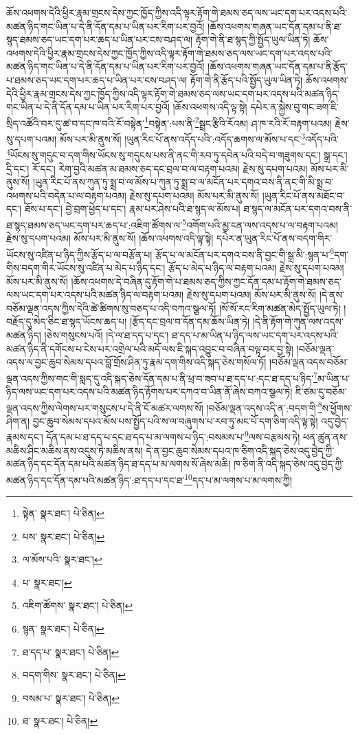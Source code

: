 ཆོས་འཕགས་དེའི་ཕྱིར་རྣམ་གྲངས་དེས་ཀྱང་ཁྱོད་ཀྱིས་འདི་ལྟར་རྟོག་གེ་ཐམས་ཅད་ལས་ཡང་དག་པར་འདས་པའི་མཚན་ཉིད་གང་ཡིན་པ་དེ་ནི་དོན་དམ་པ་ཡིན་པར་རིག་པར་བྱའོ། །ཆོས་འཕགས་གཞན་ཡང་དོན་དམ་པ་ནི་ཐ་སྙད་ཐམས་ཅད་ཡང་དག་པར་ཆད་པ་ཡིན་པར་ངས་བཤད་ལ། རྟོག་གེ་ནི་ཐ་སྙད་ཀྱི་སྤྱོད་ཡུལ་ཡིན་ཏེ། ཆོས་འཕགས་དེའི་ཕྱིར་རྣམ་གྲངས་དེས་ཀྱང་ཁྱོད་ཀྱིས་འདི་ལྟར་རྟོག་གེ་ཐམས་ཅད་ལས་ཡང་དག་པར་འདས་པའི་མཚན་ཉིད་གང་ཡིན་པ་དེ་ནི་དོན་དམ་པ་ཡིན་པར་རིག་པར་བྱའོ། །ཆོས་འཕགས་གཞན་ཡང་དོན་དམ་པ་ནི་རྩོད་པ་ཐམས་ཅད་ཡང་དག་པར་ཆད་པ་ཡིན་པར་ངས་བཤད་ལ། རྟོག་གེ་ནི་རྩོད་པའི་སྤྱོད་ཡུལ་ཡིན་ཏེ། ཆོས་འཕགས་དེའི་ཕྱིར་རྣམ་གྲངས་དེས་ཀྱང་ཁྱོད་ཀྱིས་འདི་ལྟར་རྟོག་གེ་ཐམས་ཅད་ལས་ཡང་དག་པར་འདས་པའི་མཚན་ཉིད་གང་ཡིན་པ་དེ་ནི་དོན་དམ་པ་ཡིན་པར་རིག་པར་བྱའོ། །ཆོས་འཕགས་འདི་ལྟ་སྟེ། དཔེར་ན་སྐྱེས་བུ་གང་ཟག་ཇི་སྲིད་འཚོའི་བར་དུ་ཚ་བ་དང་ཁ་བའི་རོ་བསྟེན་\footnote{སྟེན་  སྣར་ཐང་།  པེ་ཅིན། }བསྟེན་:པས་ནི་\footnote{པས་  སྣར་ཐང་།  པེ་ཅིན། }སྦྲང་རྩིའི་རོའམ། ཤ་ཁ་རའི་རོ་བརྟག་པའམ། རྗེས་སུ་དཔག་པའམ། མོས་པར་མི་ནུས་སོ། །ཡུན་རིང་པོ་ནས་འདོད་པའི་:འདོད་ཆགས་ལ་མོས་པ་དང་\footnote{ལ་མོས་པའི་  སྣར་ཐང་། }འདོད་པའི་\footnote{པ་  སྣར་ཐང་། }ཡོངས་སུ་གདུང་བ་དག་གིས་ཡོངས་སུ་གདུངས་པས་ནི་ནང་གི་རབ་ཏུ་དབེན་པའི་བདེ་བ་གཟུགས་དང་། སྒྲ་དང་། དྲི་དང་། རོ་དང་། རེག་བྱའི་མཚན་མ་ཐམས་ཅད་དང་བྲལ་བ་ལ་བརྟག་པའམ། རྗེས་སུ་དཔག་པའམ། མོས་པར་མི་ནུས་སོ། །ཡུན་རིང་པོ་ནས་ཀུན་ཏུ་སྨྲ་བ་ལ་མོས་པ་ཀུན་ཏུ་སྨྲ་བ་ལ་མངོན་པར་དགའ་བས་ནི་ནང་གི་མི་སྨྲ་བ་འཕགས་པའི་བདེན་པ་ལ་བརྟག་པའམ། རྗེས་སུ་དཔག་པའམ། མོས་པར་མི་ནུས་སོ། །ཡུན་རིང་པོ་ནས་མཐོང་བ་དང་། ཐོས་པ་དང་། བྱེ་བྲག་ཕྱེད་པ་དང་། རྣམ་པར་ཤེས་པའི་ཐ་སྙད་ལ་མོས་པ། ཐ་སྙད་ལ་མངོན་པར་དགའ་བས་ནི་ཐ་སྙད་ཐམས་ཅད་ཡང་དག་པར་ཆད་པ་:འཇིག་ཚོགས་ལ་\footnote{འཇིག་ཚོགས་  སྣར་ཐང་།  པེ་ཅིན། }འགོག་པའི་མྱ་ངན་ལས་འདས་པ་ལ་བརྟག་པའམ། རྗེས་སུ་དཔག་པའམ། མོས་པར་མི་ནུས་སོ། །ཆོས་འཕགས་འདི་ལྟ་སྟེ། དཔེར་ན་ཡུན་རིང་པོ་ནས་བདག་གིར་ཡོངས་སུ་འཛིན་པ་ཉིད་ཀྱིས་རྩོད་པ་ལ་བརྩོན་པ། རྩོད་པ་ལ་མངོན་པར་དགའ་བས་ནི་བྱང་གི་སྒྲ་མི་:སྙན་པ་\footnote{སྙན་  སྣར་ཐང་།  པེ་ཅིན། }དག་གིས་བདག་གིར་ཡོངས་སུ་འཛིན་པ་མེད་པ་ཉིད་དང་། རྩོད་པ་མེད་པ་ཉིད་ལ་བརྟག་པའམ། རྗེས་སུ་དཔག་པའམ། མོས་པར་མི་ནུས་སོ། །ཆོས་འཕགས་དེ་བཞིན་དུ་རྟོག་གེ་པ་ཐམས་ཅད་ཀྱིས་ཀྱང་དོན་དམ་པ་རྟོག་གེ་ཐམས་ཅད་ལས་ཡང་དག་པར་འདས་པའི་མཚན་ཉིད་ལ་བརྟག་པའམ། རྗེས་སུ་དཔག་པའམ། མོས་པར་མི་ནུས་སོ། །དེ་ནས་བཅོམ་ལྡན་འདས་ཀྱིས་དེའི་ཚེ་ཚིགས་སུ་བཅད་པ་འདི་བཀའ་སྩལ་ཏོ། །སོ་སོ་རང་རིག་མཚན་མེད་སྤྱོད་ཡུལ་ཏེ། །བརྗོད་དུ་མེད་ཅིང་ཐ་སྙད་ཡོངས་ཆད་པ། །རྩོད་དང་བྲལ་བ་དོན་དམ་ཆོས་ཡིན་ཏེ། །དེ་ནི་རྟོག་གེ་ཀུན་ལས་འདས་མཚན་ཉིད། །ཅེས་གསུངས་པའོ། །དེ་ལ་ཐ་དད་པ་དང་། ཐ་དད་པ་མ་ཡིན་པ་ཉིད་ལས་ཡང་དག་པར་འདས་པའི་མཚན་ཉིད་ནི་དགོངས་པ་ངེས་པར་འགྲེལ་པའི་མདོ་ལས་ཇི་སྐད་འབྱུང་བ་བཞིན་བལྟ་བར་བྱ་སྟེ། །བཅོམ་ལྡན་འདས་ལ་བྱང་ཆུབ་སེམས་དཔའ་བློ་གྲོས་ཤིན་ཏུ་རྣམ་དག་གིས་འདི་སྐད་ཅེས་གསོལ་ཏོ། །བཅོམ་ལྡན་འདས་བཅོམ་ལྡན་འདས་ཀྱིས་གང་གི་སླད་དུ་འདི་སྐད་ཅེས་དོན་དམ་པ་ནི་ཕྲ་བ་ཟབ་པ་ཐ་དད་པ་:དང་ཐ་དད་པ་ཉིད་\footnote{ཐ་དད་པ་  སྣར་ཐང་།  པེ་ཅིན། }མ་ཡིན་པ་ཉིད་ལས་ཡང་དག་པར་འདས་པའི་མཚན་ཉིད་རྟོགས་པར་དཀའ་བ་ཡིན་ནོ་ཞེས་བཀའ་སྩལ་ཏེ། ཇི་ཙམ་དུ་བཅོམ་ལྡན་འདས་ཀྱིས་ལེགས་པར་གསུངས་པ་དེ་ནི་ངོ་མཚར་ལགས་སོ། །བཅོམ་ལྡན་འདས་འདི་ན་:བདག་གི་\footnote{བདག་གིས་  སྣར་ཐང་།  པེ་ཅིན། }ས་ཕྱོགས་ཤིག་ན། བྱང་ཆུབ་སེམས་དཔའ་མོས་པས་སྤྱོད་པའི་ས་ལ་བཞུགས་པ་རབ་ཏུ་མང་པོ་དག་ཅིག་འདི་ལྟ་སྟེ། འདུ་བྱེད་རྣམས་དང་། དོན་དམ་པ་ཐ་དད་པ་དང་ཐ་དད་པ་མ་ལགས་པ་ཉིད་:བསམས་པ་\footnote{བསམ་པ་  སྣར་ཐང་།  པེ་ཅིན། }ལས་བརྩམས་ཏེ། ཕན་ཚུན་ནས་མཆིས་ཤིང་མཆིས་ནས་འདུས་ཏེ་མཆིས་ནས། དེ་ན་བྱང་ཆུབ་སེམས་དཔའ་ཁ་ཅིག་འདི་སྐད་ཅེས་འདུ་བྱེད་ཀྱི་མཚན་ཉིད་དང་དོན་དམ་པའི་མཚན་ཉིད་ཐ་དད་པ་མ་ལགས་སོ་ཞེས་མཆི། ཁ་ཅིག་ནི་འདི་སྐད་ཅེས་འདུ་བྱེད་ཀྱི་མཚན་ཉིད་དང་དོན་དམ་པའི་མཚན་ཉིད་:ཐ་དད་པ་དང་ཐ་\footnote{ཐ་  སྣར་ཐང་།  པེ་ཅིན། }དད་པ་མ་ལགས་པ་མ་ལགས་ཀྱི། 